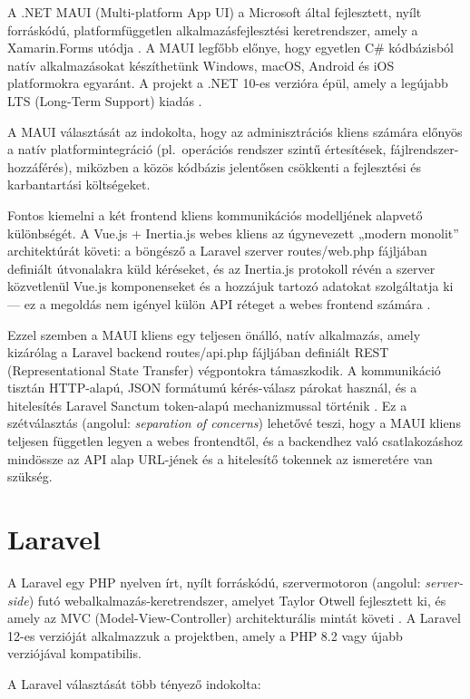 \documentclass[colorlinks]{thesis-kando}
\begin{document}
A .NET MAUI (Multi-platform App UI) a Microsoft által fejlesztett, nyílt forráskódú, platformfüggetlen alkalmazásfejlesztési keretrendszer, amely a Xamarin.Forms utódja \cite{ref9}. A MAUI legfőbb előnye, hogy egyetlen C\# kódbázisból natív alkalmazásokat készíthetünk Windows, macOS, Android és iOS platformokra egyaránt. A projekt a .NET 10-es verzióra épül, amely a legújabb LTS (Long-Term Support) kiadás \cite{ref10}.

A MAUI választását az indokolta, hogy az adminisztrációs kliens számára előnyös a natív platformintegráció (pl.\ operációs rendszer szintű értesítések, fájlrendszer-hozzáférés), miközben a közös kódbázis jelentősen csökkenti a fejlesztési és karbantartási költségeket.

Fontos kiemelni a két frontend kliens kommunikációs modelljének alapvető különbségét. A Vue.js + Inertia.js webes kliens az úgynevezett „modern monolit'' architektúrát követi: a böngésző a Laravel szerver routes/web.php fájljában definiált útvonalakra küld kéréseket, és az Inertia.js protokoll révén a szerver közvetlenül Vue.js komponenseket és a hozzájuk tartozó adatokat szolgáltatja ki --- ez a megoldás nem igényel külön API réteget a webes frontend számára \cite{ref5}.

Ezzel szemben a MAUI kliens egy teljesen önálló, natív alkalmazás, amely kizárólag a Laravel backend routes/api.php fájljában definiált REST (Representational State Transfer) \cite{ref11} végpontokra támaszkodik. A kommunikáció tisztán HTTP-alapú, JSON formátumú kérés-válasz párokat használ, és a hitelesítés Laravel Sanctum token-alapú mechanizmussal történik \cite{ref12}. Ez a szétválasztás (angolul: \emph{separation of concerns}) lehetővé teszi, hogy a MAUI kliens teljesen független legyen a webes frontendtől, és a backendhez való csatlakozáshoz mindössze az API alap URL-jének és a hitelesítő tokennek az ismeretére van szükség.

\section{Laravel}

A Laravel egy PHP nyelven írt, nyílt forráskódú, szervermotoron (angolul: \emph{server-side}) futó webalkalmazás-keretrendszer, amelyet Taylor Otwell fejlesztett ki, és amely az MVC (Model-View-Controller) architekturális mintát követi \cite{ref13}. A Laravel 12-es verzióját alkalmazzuk a projektben, amely a PHP 8.2 vagy újabb verziójával kompatibilis.

A Laravel választását több tényező indokolta:
\end{document}
